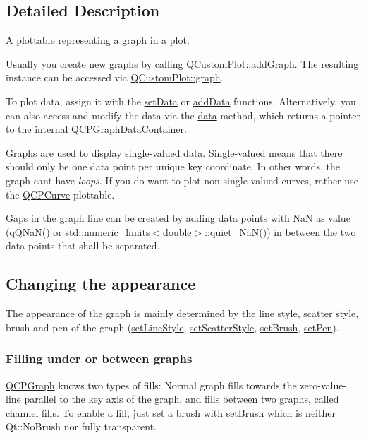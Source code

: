 \subsection{Detailed Description}
A plottable representing a graph in a plot. 



Usually you create new graphs by calling \hyperlink{class_q_custom_plot_a6fb2873d35a8a8089842d81a70a54167}{Q\+Custom\+Plot\+::add\+Graph}. The resulting instance can be accessed via \hyperlink{class_q_custom_plot_a6d3ed93c2bf46ab7fa670d66be4cddaf}{Q\+Custom\+Plot\+::graph}.

To plot data, assign it with the \hyperlink{class_q_c_p_graph_a1eae9429a316b008e2d99b2d65a54395}{set\+Data} or \hyperlink{class_q_c_p_graph_ae0555c0d3fe0fa7cb8628f88158d420f}{add\+Data} functions. Alternatively, you can also access and modify the data via the \hyperlink{class_q_c_p_graph_a04514a2b1fb61a280ead66abe80b89ab}{data} method, which returns a pointer to the internal Q\+C\+P\+Graph\+Data\+Container.

Graphs are used to display single-\/valued data. Single-\/valued means that there should only be one data point per unique key coordinate. In other words, the graph can\textquotesingle{}t have {\itshape loops}. If you do want to plot non-\/single-\/valued curves, rather use the \hyperlink{class_q_c_p_curve}{Q\+C\+P\+Curve} plottable.

Gaps in the graph line can be created by adding data points with NaN as value ({\ttfamily q\+Q\+Na\+N()} or {\ttfamily std\+::numeric\+\_\+limits$<$double$>$\+::quiet\+\_\+\+Na\+N()}) in between the two data points that shall be separated.\hypertarget{class_q_c_p_graph_qcpgraph-appearance}{}\subsection{Changing the appearance}\label{class_q_c_p_graph_qcpgraph-appearance}
The appearance of the graph is mainly determined by the line style, scatter style, brush and pen of the graph (\hyperlink{class_q_c_p_graph_a513fecccff5b2a50ce53f665338c60ff}{set\+Line\+Style}, \hyperlink{class_q_c_p_graph_a12bd17a8ba21983163ec5d8f42a9fea5}{set\+Scatter\+Style}, \hyperlink{class_q_c_p_abstract_plottable_a7a4b92144dca6453a1f0f210e27edc74}{set\+Brush}, \hyperlink{class_q_c_p_abstract_plottable_ab74b09ae4c0e7e13142fe4b5bf46cac7}{set\+Pen}).\hypertarget{class_q_c_p_graph_filling}{}\subsubsection{Filling under or between graphs}\label{class_q_c_p_graph_filling}
\hyperlink{class_q_c_p_graph}{Q\+C\+P\+Graph} knows two types of fills\+: Normal graph fills towards the zero-\/value-\/line parallel to the key axis of the graph, and fills between two graphs, called channel fills. To enable a fill, just set a brush with \hyperlink{class_q_c_p_abstract_plottable_a7a4b92144dca6453a1f0f210e27edc74}{set\+Brush} which is neither Qt\+::\+No\+Brush nor fully transparent.

